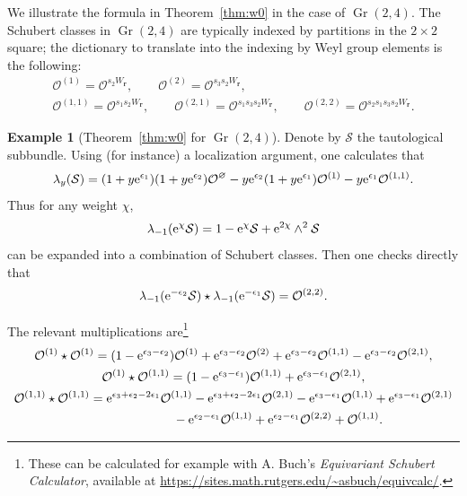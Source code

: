 \documentclass[pdftex]{sigma}
\numberwithin{equation}{section}
\theoremstyle{definition}
\newtheorem{Example}[Theorem]{Example}
\DeclareMathOperator{\Gr}{Gr}
\newcommand{\bfr}{{\mathbf r}}
\newcommand{\cO}{{\mathcal O}}
\newcommand{\cS}{{\mathcal S}}
\begin{document}
We illustrate the formula in Theorem~\ref{thm:w0} in the case of $\Gr(2,4)$.
The Schubert classes in $\Gr(2,4)$ are typically indexed by partitions
in the $2 \times 2$ square; the dictionary to translate into the indexing by Weyl group elements is the following:
\begin{gather*}
\cO^{(1)}= \cO^{s_2 W_\bfr},\qquad \cO^{(2)}= \cO^{s_3 s_2 W_\bfr},\\
\cO^{(1,1)}= \cO^{s_1s_2 W_\bfr},\qquad \cO^{(2,1)}= \cO^{s_1s_3s_2 W_\bfr},\qquad \cO^{(2,2)}= \cO^{s_2 s_1 s_3 s_2 W_\bfr} .
\end{gather*}

\begin{Example}[Theorem~\ref{thm:w0} for $\Gr(2,4)$]
Denote by $\cS$ the tautological subbundle.
Using (for instance) a
localization argument, one calculates that
\[ \lambda_y(\cS) = (1+y {\rm e}^{\epsilon_1}) (1+y {\rm e}^{\epsilon_2}) \cO^{\varnothing} -y {\rm e}^{\epsilon_2}(1+y {\rm e}^{\epsilon_1})\cO^{(1)}- y {\rm e}^{\epsilon_1} \cO^{(1,1)} . \]
Thus for any weight $\chi$,
\[ \lambda_{-1}({\rm e}^{\chi} \cS) = 1 - {\rm e}^{\chi} \cS + {\rm e}^{2\chi} \wedge^2 \cS \/ \]
can be expanded into a combination of Schubert classes. Then one checks directly that
\[ \lambda_{-1}({\rm e}^{-\epsilon_2} \cS) \star \lambda_{-1}({\rm e}^{-\epsilon_1} \cS) = \cO^{(2,2)} . \]

The relevant multiplications are\footnote{These can be calculated for example with A. Buch's {\em Equivariant Schubert Calculator}, available at \url{https://sites.math.rutgers.edu/~asbuch/equivcalc/}.}
\begin{gather*}
\cO^{(1)} \star \cO^{(1)} = (1- {\rm e}^{\epsilon_3-\epsilon_2})\cO^{(1)} + {\rm e}^{\epsilon_3-\epsilon_2}\cO^{(2)} + {\rm e}^{\epsilon_3-\epsilon_2}\cO^{(1,1)}-{\rm e}^{\epsilon_3-\epsilon_2}\cO^{(2,1)}, \\
\cO^{(1)} \star \cO^{(1,1)} = (1- {\rm e}^{\epsilon_3-\epsilon_1})\cO^{(1,1)} + {\rm e}^{\epsilon_3-\epsilon_1}\cO^{(2,1)}, \\
\cO^{(1,1)} \star \cO^{(1,1)} = {\rm e}^{\epsilon_3+\epsilon_2-2 \epsilon_1} \cO^{(1,1)} -
 {\rm e}^{\epsilon_3+\epsilon_2-2 \epsilon_1} \cO^{(2,1)} - {\rm e}^{\epsilon_3-\epsilon_1}\cO^{(1,1)}
 + {\rm e}^{\epsilon_3-\epsilon_1}\cO^{(2,1)} \\
 \hphantom{\cO^{(1,1)} \star \cO^{(1,1)} =}{}
 - {\rm e}^{\epsilon_2-\epsilon_1}\cO^{(1,1)} +{\rm e}^{\epsilon_2-\epsilon_1}\cO^{(2,2)} + \cO^{(1,1)} .
 \end{gather*}
\end{Example}
\end{document}
